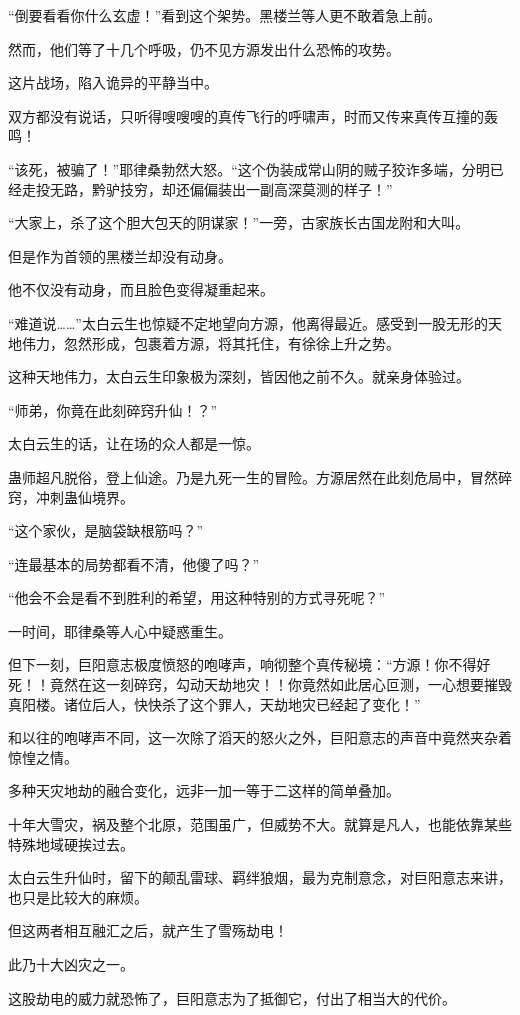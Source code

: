 \begin{this_body}
“倒要看看你什么玄虚！”看到这个架势。黑楼兰等人更不敢着急上前。

然而，他们等了十几个呼吸，仍不见方源发出什么恐怖的攻势。

这片战场，陷入诡异的平静当中。

双方都没有说话，只听得嗖嗖嗖的真传飞行的呼啸声，时而又传来真传互撞的轰鸣！

“该死，被骗了！”耶律桑勃然大怒。“这个伪装成常山阴的贼子狡诈多端，分明已经走投无路，黔驴技穷，却还偏偏装出一副高深莫测的样子！”

“大家上，杀了这个胆大包天的阴谋家！”一旁，古家族长古国龙附和大叫。

但是作为首领的黑楼兰却没有动身。

他不仅没有动身，而且脸色变得凝重起来。

“难道说……”太白云生也惊疑不定地望向方源，他离得最近。感受到一股无形的天地伟力，忽然形成，包裹着方源，将其托住，有徐徐上升之势。

这种天地伟力，太白云生印象极为深刻，皆因他之前不久。就亲身体验过。

“师弟，你竟在此刻碎窍升仙！？”

太白云生的话，让在场的众人都是一惊。

蛊师超凡脱俗，登上仙途。乃是九死一生的冒险。方源居然在此刻危局中，冒然碎窍，冲刺蛊仙境界。

“这个家伙，是脑袋缺根筋吗？”

“连最基本的局势都看不清，他傻了吗？”

“他会不会是看不到胜利的希望，用这种特别的方式寻死呢？”

一时间，耶律桑等人心中疑惑重生。

但下一刻，巨阳意志极度愤怒的咆哮声，响彻整个真传秘境：“方源！你不得好死！！竟然在这一刻碎窍，勾动天劫地灾！！你竟然如此居心叵测，一心想要摧毁真阳楼。诸位后人，快快杀了这个罪人，天劫地灾已经起了变化！”

和以往的咆哮声不同，这一次除了滔天的怒火之外，巨阳意志的声音中竟然夹杂着惊惶之情。

多种天灾地劫的融合变化，远非一加一等于二这样的简单叠加。

十年大雪灾，祸及整个北原，范围虽广，但威势不大。就算是凡人，也能依靠某些特殊地域硬挨过去。

太白云生升仙时，留下的颠乱雷球、羁绊狼烟，最为克制意念，对巨阳意志来讲，也只是比较大的麻烦。

但这两者相互融汇之后，就产生了雪殇劫电！

此乃十大凶灾之一。

这股劫电的威力就恐怖了，巨阳意志为了抵御它，付出了相当大的代价。


\end{this_body}
